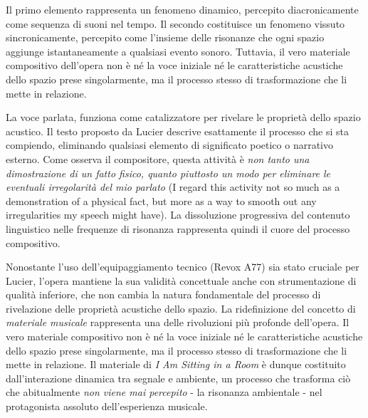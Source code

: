 Il primo elemento rappresenta un fenomeno dinamico, percepito diacronicamente come sequenza di suoni nel tempo. Il secondo costituisce un fenomeno vissuto sincronicamente, percepito come l'insieme delle risonanze che ogni spazio aggiunge istantaneamente a qualsiasi evento sonoro. Tuttavia, il vero materiale compositivo dell'opera non è né la voce iniziale né le caratteristiche acustiche dello spazio prese singolarmente, ma il processo stesso di trasformazione che li mette in relazione.

La voce parlata, funziona come catalizzatore per rivelare le proprietà dello spazio acustico. Il testo proposto da Lucier descrive esattamente il processo che si sta compiendo, eliminando qualsiasi elemento di significato poetico o narrativo esterno. Come osserva il compositore, questa attività è \textit{non tanto una dimostrazione di un fatto fisico, quanto piuttosto un modo per eliminare le eventuali irregolarità del mio parlato} (I regard this activity not so much as a demonstration of a physical fact, but more as a way to smooth out any irregularities my speech might have). La dissoluzione progressiva del contenuto linguistico nelle frequenze di risonanza rappresenta quindi il cuore del processo compositivo.

Nonostante l'uso dell'equipaggiamento tecnico (Revox A77) sia stato cruciale per Lucier, l'opera mantiene la sua validità concettuale anche con strumentazione di qualità inferiore, che non cambia la natura fondamentale del processo di rivelazione delle proprietà acustiche dello spazio. La ridefinizione del concetto di \textit{materiale musicale} rappresenta una delle rivoluzioni più profonde dell'opera. Il vero materiale compositivo non è né la voce iniziale né le caratteristiche acustiche dello spazio prese singolarmente, ma il processo stesso di trasformazione che li mette in relazione. Il materiale di \textit{I Am Sitting in a Room} è dunque costituito dall'interazione dinamica tra segnale e ambiente, un processo che trasforma ciò che abitualmente \textit{non viene mai percepito} - la risonanza ambientale - nel protagonista assoluto dell'esperienza musicale.